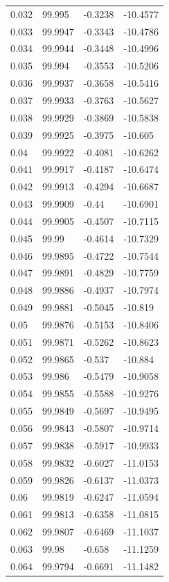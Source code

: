 \begin{tabular}{llll}
0.032 & 99.995 & -0.3238 & -10.4577 \\
0.033 & 99.9947 & -0.3343 & -10.4786 \\
0.034 & 99.9944 & -0.3448 & -10.4996 \\
0.035 & 99.994 & -0.3553 & -10.5206 \\
0.036 & 99.9937 & -0.3658 & -10.5416 \\
0.037 & 99.9933 & -0.3763 & -10.5627 \\
0.038 & 99.9929 & -0.3869 & -10.5838 \\
0.039 & 99.9925 & -0.3975 & -10.605 \\
0.04 & 99.9922 & -0.4081 & -10.6262 \\
0.041 & 99.9917 & -0.4187 & -10.6474 \\
0.042 & 99.9913 & -0.4294 & -10.6687 \\
0.043 & 99.9909 & -0.44 & -10.6901 \\
0.044 & 99.9905 & -0.4507 & -10.7115 \\
0.045 & 99.99 & -0.4614 & -10.7329 \\
0.046 & 99.9895 & -0.4722 & -10.7544 \\
0.047 & 99.9891 & -0.4829 & -10.7759 \\
0.048 & 99.9886 & -0.4937 & -10.7974 \\
0.049 & 99.9881 & -0.5045 & -10.819 \\
0.05 & 99.9876 & -0.5153 & -10.8406 \\
0.051 & 99.9871 & -0.5262 & -10.8623 \\
0.052 & 99.9865 & -0.537 & -10.884 \\
0.053 & 99.986 & -0.5479 & -10.9058 \\
0.054 & 99.9855 & -0.5588 & -10.9276 \\
0.055 & 99.9849 & -0.5697 & -10.9495 \\
0.056 & 99.9843 & -0.5807 & -10.9714 \\
0.057 & 99.9838 & -0.5917 & -10.9933 \\
0.058 & 99.9832 & -0.6027 & -11.0153 \\
0.059 & 99.9826 & -0.6137 & -11.0373 \\
0.06 & 99.9819 & -0.6247 & -11.0594 \\
0.061 & 99.9813 & -0.6358 & -11.0815 \\
0.062 & 99.9807 & -0.6469 & -11.1037 \\
0.063 & 99.98 & -0.658 & -11.1259 \\
0.064 & 99.9794 & -0.6691 & -11.1482 \\

\end{tabular}
